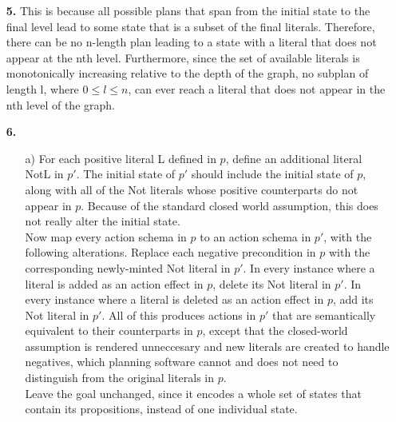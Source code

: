 \documentclass{article}
\begin{document}
\begin{enumerate}
\item[\textbf{5.}]
This is because all possible plans that span from the initial state to the final
level lead to some state that is a subset of the final literals. Therefore,
there can be no n-length plan leading to a state with a literal that does not
appear at the nth level. Furthermore, since the set of available literals is
monotonically increasing relative to the depth of the graph, no subplan of
length l, where $0 \le l \le n$, can ever reach a literal that does not appear
in the nth level of the graph.

\item[\textbf{6.}]

\begin{enumerate}
\item[a)]
For each positive literal L defined in $p$, define an additional
literal NotL in $p'$. The initial state of $p'$ should include the initial
state of $p$, along with all of the Not literals whose positive
counterparts do not appear in $p$. Because of the standard closed world
assumption, this does not really alter the initial state.\\
\vspace{6pt}
Now map every action schema in $p$ to an action schema in $p'$, with the
following alterations. Replace each negative precondition in $p$ with the
corresponding newly-minted Not literal in $p'$. In every instance where a
literal is added as an action effect in $p$, delete its Not literal in $p'$. In
every instance where a literal is deleted as an action effect in $p$, add its
Not literal in $p'$. All of this produces actions in $p'$ that are semantically
equivalent to their counterparts in $p$, except that the closed-world assumption
is rendered unneccesary and new literals are created to handle negatives,
which planning software cannot and does not need to distinguish from
the original literals in $p$.\\
\vspace{6pt}
Leave the goal unchanged, since it encodes a whole set of states that contain
its propositions, instead of one individual state.


\end{enumerate}
\end{enumerate}
\end{document}
